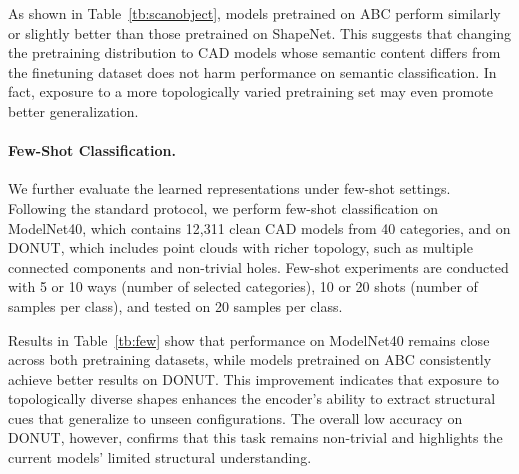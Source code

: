 As shown in Table~\ref{tb:scanobject}, models pretrained on ABC perform similarly or slightly better than those pretrained on ShapeNet. This suggests that changing the pretraining distribution to CAD models whose semantic content differs from the finetuning dataset does not harm performance on semantic classification. In fact, exposure to a more topologically varied pretraining set may even promote better generalization.



\paragraph{Few-Shot Classification.}
We further evaluate the learned representations under few-shot settings. Following the standard protocol, we perform few-shot classification on ModelNet40, which contains 12,311 clean CAD models from 40 categories, and on DONUT, which includes point clouds with richer topology, such as multiple connected components and non-trivial holes. Few-shot experiments are conducted with 5 or 10 ways (number of selected categories), 10 or 20 shots (number of samples per class), and tested on 20 samples per class.

Results in Table~\ref{tb:few} show that performance on ModelNet40 remains close across both pretraining datasets, while models pretrained on ABC consistently achieve better results on DONUT. This improvement indicates that exposure to topologically diverse shapes enhances the encoder’s ability to extract structural cues that generalize to unseen configurations. The overall low accuracy on DONUT, however, confirms that this task remains non-trivial and highlights the current models’ limited structural understanding.
